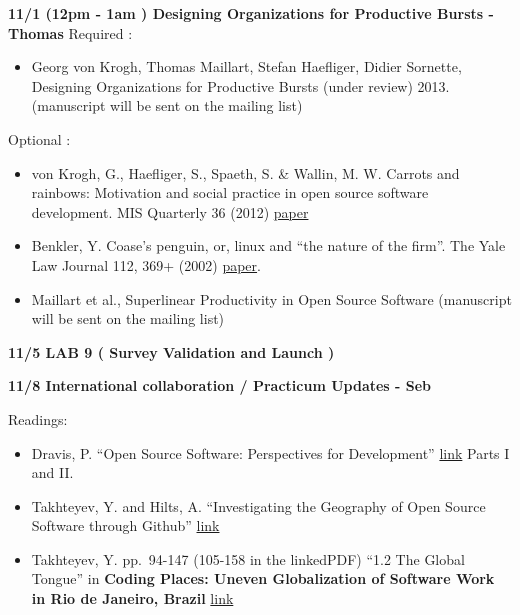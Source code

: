 \textbf{11/1 (12pm - 1am ) Designing Organizations for Productive Bursts
- Thomas} Required :

\begin{itemize}
\itemsep1pt\parskip0pt
\item
  Georg von Krogh, Thomas Maillart, Stefan Haefliger, Didier Sornette,
  Designing Organizations for Productive Bursts (under review) 2013.
  (manuscript will be sent on the mailing list)
\end{itemize}

Optional :

\begin{itemize}
\itemsep1pt\parskip0pt
\item
  von Krogh, G., Haefliger, S., Spaeth, S. \& Wallin, M. W. Carrots and
  rainbows: Motivation and social practice in open source software
  development. MIS Quarterly 36 (2012)
  \href{http://search.ebscohost.com/login.aspx?direct=true\&db=bth\&AN=74756698\&site=ehost-live}{paper}
\item
  Benkler, Y. Coase's penguin, or, linux and ``the nature of the firm''.
  The Yale Law Journal 112, 369+ (2002)
  \href{www.yale.edu/yalelj/112/BenklerWEB.pdf‎}{paper}.
\item
  Maillart et al., Superlinear Productivity in Open Source Software
  (manuscript will be sent on the mailing list)
\end{itemize}

\textbf{11/5 LAB 9 ( Survey Validation and Launch )}

\textbf{11/8 International collaboration / Practicum Updates - Seb}

Readings:

\begin{itemize}
\itemsep1pt\parskip0pt
\item
  Dravis, P. ``Open Source Software: Perspectives for Development''
  \href{http://www.infodev.org/infodev-files/resource/InfodevDocuments_21.pdf}{link}
  Parts I and II.
\item
  Takhteyev, Y. and Hilts, A. ``Investigating the Geography of Open
  Source Software through Github''
  \href{http://www.takhteyev.org/papers/Takhteyev-Hilts-2010.pdf}{link}
\item
  Takhteyev, Y. pp.~94-147 (105-158 in the linkedPDF) ``1.2 The Global
  Tongue'' in \textbf{Coding Places: Uneven Globalization of Software
  Work in Rio de Janeiro, Brazil}
  \href{http://codingplaces.net/static/takhteyev_2009_dissertation.pdf}{link}
\end{itemize}

